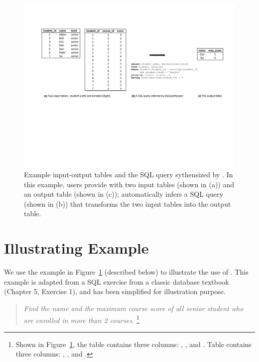 
\begin{figure}[t]
  \centering
  \includegraphics[scale=0.70]{motivating}
  \vspace*{-1.0ex}\caption {{\label{fig:motivating}
  Example input-output tables and the SQL query sythensized by
  \ourtool. In this example, users provide \ourtool with
  two input tables (shown in (a)) and an output table (shown in (c));
  \ourtool automatically infers a SQL query (shown in (b)) that
  transforms the two input tables into the output table.
}}
\end{figure}

\section{Illustrating Example}
\label{sec:example}

We use the example in Figure~\ref{fig:motivating} (described below)
to illustrate the use of \ourtool. This example is
adapted from a SQL exercise from a classic
database textbook~\cite{cowbook} (Chapter 5, Exercise 1),
and has been simplified for illustration purpose.

\begin{quote}
\textit{Find the name and the maximum course score of all senior student
who are enrolled in more than 2 courses.}
\footnote{
Shown in Figure~\ref{fig:motivating}, the  table
contains three columns: , ,
and . Table  contains
three columns: , ,
and .
}
\end{quote}


